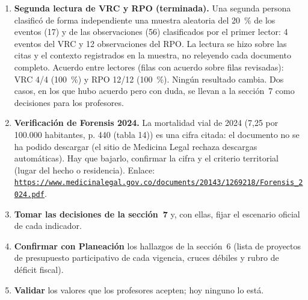 \documentclass[11pt,letterpaper]{article}
\begin{document}
\begin{enumerate}

\item \textbf{Segunda lectura de VRC y RPO (terminada).} Una segunda persona clasificó de forma independiente una muestra aleatoria del 20~\% de los eventos (17) y de las observaciones (56) clasificados por el primer lector: 4 eventos del VRC y 12 observaciones del RPO. La lectura se hizo sobre las citas y el contexto registrados en la muestra, no releyendo cada documento completo. Acuerdo entre lectores (filas con acuerdo sobre filas revisadas): VRC 4/4 (100~\%) y RPO 12/12 (100~\%). Ningún resultado cambia. Dos casos, en los que hubo acuerdo pero con duda, se llevan a la sección~7 como decisiones para los profesores.

\item \textbf{Verificación de Forensis 2024.} La mortalidad vial de 2024 (7,25 por 100.000 habitantes, p. 440 (tabla 14)) es una cifra citada: el documento no se ha podido descargar (el sitio de Medicina Legal rechaza descargas automáticas). Hay que bajarlo, confirmar la cifra y el criterio territorial (lugar del hecho o residencia). Enlace: \texttt{\footnotesize \href{https://www.medicinalegal.gov.co/documents/20143/1269218/Forensis_2024.pdf}{https:/\allowbreak{}}\allowbreak{}\href{https://www.medicinalegal.gov.co/documents/20143/1269218/Forensis_2024.pdf}{/\allowbreak{}}\allowbreak{}\href{https://www.medicinalegal.gov.co/documents/20143/1269218/Forensis_2024.pdf}{www.\allowbreak{}medicinalegal.\allowbreak{}gov.\allowbreak{}co/\allowbreak{}}\allowbreak{}\href{https://www.medicinalegal.gov.co/documents/20143/1269218/Forensis_2024.pdf}{documents/\allowbreak{}}\allowbreak{}\href{https://www.medicinalegal.gov.co/documents/20143/1269218/Forensis_2024.pdf}{20143/\allowbreak{}}\allowbreak{}\href{https://www.medicinalegal.gov.co/documents/20143/1269218/Forensis_2024.pdf}{1269218/\allowbreak{}}\allowbreak{}\href{https://www.medicinalegal.gov.co/documents/20143/1269218/Forensis_2024.pdf}{Forensis\_\allowbreak{}2024.\allowbreak{}pdf}}.

\item \textbf{Tomar las decisiones de la sección~7} y, con ellas, fijar el escenario oficial de cada indicador.

\item \textbf{Confirmar con Planeación} los hallazgos de la sección~6 (lista de proyectos de presupuesto participativo de cada vigencia, cruces débiles y rubro de déficit fiscal).

\item \textbf{Validar} los valores que los profesores acepten; hoy ninguno lo está.

\end{enumerate}
\end{document}
